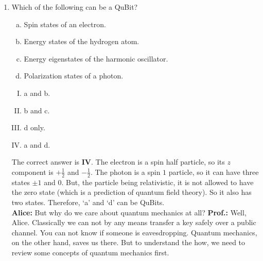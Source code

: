 \documentclass[12pt]{article}
\newcommand\half{\frac{1}{2}}
\newcommand\tbf[1]{\textbf{#1}}
\newcommand\ta{\tbf{Alice: }}
\newcommand\tp{\tbf{Prof.: }}
\begin{document}
\begin{enumerate}[1.]
\begin{enumerate}[I.]
		\end{enumerate}
		It is number \tbf{III}, because negative, positive and zero are three possible states, and if you toss two coins simultaneously, the outcome has three possible values out of head-head, head-tail and tail-tail, if you do not distinguish between the coins. \\ \newline
\tp But bits are not necessarily classical. There can be quantum mechanical bits called Qu-Bits. \\ \newline
	\item Which of the following can be a QuBit?
		\begin{enumerate}[a)]
			\item Spin states of an electron.
			\item Energy states of the hydrogen atom.
			\item Energy eigenstates of the harmonic oscillator.
			\item Polarization states of a photon. \\ \newline
		\end{enumerate}
		\begin{enumerate}[I.]
			\item a and b.
			\item b and c.
			\item d only.
			\item a and d. \\ \newline
 		\end{enumerate}
 		The correct answer is \tbf{IV}. The electron is a spin half particle,  so its $z$ component is $+\half$ and $-\half$. The photon is a spin $1$ particle, so it can have three states $\pm 1$ and $0$. But, the particle being relativistic, it is not allowed to have the zero state (which is a prediction of quantum field theory). So it also has two states. Therefore, `a' and `d' can be QuBits. \\ \newline
 \ta But why do we care about quantum mechanics at all? \newline
 \tp Well, Alice. Classically we can not by any means transfer a key safely over a public channel. You can not know if someone is eavesdropping. Quantum mechanics, on the other hand, saves us there. But to understand the how, we need to review some concepts of quantum mechanics first. \newline

\end{enumerate}
\end{document}
